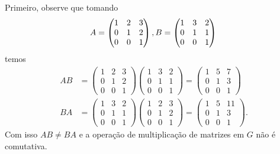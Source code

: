 \documentclass[12pt]{exam}
\begin{document}
    \noindent\solucao Primeiro, observe que tomando
    \[
        A = \begin{pmatrix}1 & 2 & 3\\0 & 1 & 2\\0 & 0 & 1\end{pmatrix},\\
        B = \begin{pmatrix}1 & 3 & 2\\0 & 1 & 1\\0 & 0 & 1\end{pmatrix}\\
    \]
    temos
    \begin{align*}
        AB &= \begin{pmatrix}1 & 2 & 3\\0 & 1 & 2\\0 & 0 & 1\end{pmatrix}\begin{pmatrix}1 & 3 & 2\\0 & 1 & 1\\0 & 0 & 1\end{pmatrix} = \begin{pmatrix}1 & 5 & 7\\0 & 1 & 3\\0 & 0 & 1\end{pmatrix}\\
        BA &= \begin{pmatrix}1 & 3 & 2\\0 & 1 & 1\\0 & 0 & 1\end{pmatrix}\begin{pmatrix}1 & 2 & 3\\0 & 1 & 2\\0 & 0 & 1\end{pmatrix} = \begin{pmatrix}1 & 5 & 11\\0 & 1 & 3\\0 & 0 & 1\end{pmatrix}.
    \end{align*}
    Com isso $AB \ne BA$ e a operação de multiplicação de matrizes em $G$ não é comutativa.
\end{document}

